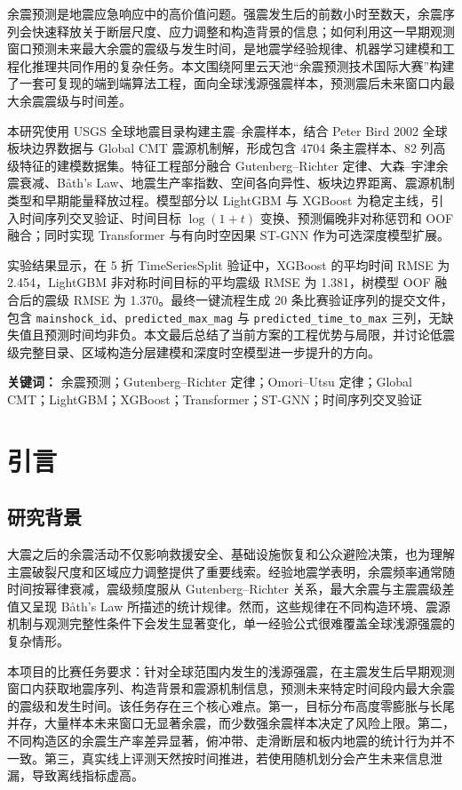\documentclass[UTF8,a4paper,12pt]{ctexrep}
\begin{document}
余震预测是地震应急响应中的高价值问题。强震发生后的前数小时至数天，余震序列会快速释放关于断层尺度、应力调整和构造背景的信息；如何利用这一早期观测窗口预测未来最大余震的震级与发生时间，是地震学经验规律、机器学习建模和工程化推理共同作用的复杂任务。本文围绕阿里云天池“余震预测技术国际大赛”构建了一套可复现的端到端算法工程，面向全球浅源强震样本，预测震后未来窗口内最大余震震级与时间差。

本研究使用 USGS 全球地震目录构建主震--余震样本，结合 Peter Bird 2002 全球板块边界数据与 Global CMT 震源机制解，形成包含 4704 条主震样本、82 列高级特征的建模数据集。特征工程部分融合 Gutenberg--Richter 定律、大森--宇津余震衰减、Båth's Law、地震生产率指数、空间各向异性、板块边界距离、震源机制类型和早期能量释放过程。模型部分以 LightGBM 与 XGBoost 为稳定主线，引入时间序列交叉验证、时间目标 \(\log(1+t)\) 变换、预测偏晚非对称惩罚和 OOF 融合；同时实现 Transformer 与有向时空因果 ST-GNN 作为可选深度模型扩展。

实验结果显示，在 5 折 TimeSeriesSplit 验证中，XGBoost 的平均时间 RMSE 为 2.454，LightGBM 非对称时间目标的平均震级 RMSE 为 1.381，树模型 OOF 融合后的震级 RMSE 为 1.370。最终一键流程生成 20 条比赛验证序列的提交文件，包含 \texttt{mainshock\_id}、\texttt{predicted\_max\_mag} 与 \texttt{predicted\_time\_to\_max} 三列，无缺失值且预测时间均非负。本文最后总结了当前方案的工程优势与局限，并讨论低震级完整目录、区域构造分层建模和深度时空模型进一步提升的方向。

\noindent\textbf{关键词：} 余震预测；Gutenberg--Richter 定律；Omori--Utsu 定律；Global CMT；LightGBM；XGBoost；Transformer；ST-GNN；时间序列交叉验证

\tableofcontents
\clearpage
{}

\chapter{引言}

\section{研究背景}
大震之后的余震活动不仅影响救援安全、基础设施恢复和公众避险决策，也为理解主震破裂尺度和区域应力调整提供了重要线索。经验地震学表明，余震频率通常随时间按幂律衰减，震级频度服从 Gutenberg--Richter 关系，最大余震与主震震级差值又呈现 Båth's Law 所描述的统计规律。然而，这些规律在不同构造环境、震源机制与观测完整性条件下会发生显著变化，单一经验公式很难覆盖全球浅源强震的复杂情形。

本项目的比赛任务要求：针对全球范围内发生的浅源强震，在主震发生后早期观测窗口内获取地震序列、构造背景和震源机制信息，预测未来特定时间段内最大余震的震级和发生时间。该任务存在三个核心难点。第一，目标分布高度零膨胀与长尾并存，大量样本未来窗口无显著余震，而少数强余震样本决定了风险上限。第二，不同构造区的余震生产率差异显著，俯冲带、走滑断层和板内地震的统计行为并不一致。第三，真实线上评测天然按时间推进，若使用随机划分会产生未来信息泄漏，导致离线指标虚高。
\end{document}
